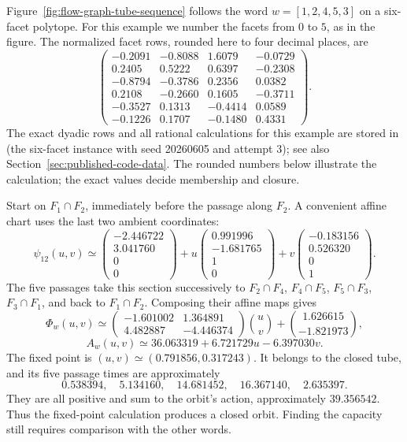 \begin{example}
\label{ex:flow-graph-return-map}
Figure~\ref{fig:flow-graph-tube-sequence} follows the word
\(w=[1,2,4,5,3]\) on a six-facet polytope.  For this example we number the
facets from \(0\) to \(5\), as in the figure.  The normalized facet rows,
rounded here to four decimal places, are
\[
\begin{pmatrix}
-0.2091&-0.8088& 1.6079&-0.0729\\
 0.2405& 0.5222& 0.6397&-0.2308\\
-0.8794&-0.3786& 0.2356& 0.0382\\
 0.2108&-0.2660& 0.1605&-0.3711\\
-0.3527& 0.1313&-0.4414& 0.0589\\
-0.1226& 0.1707&-0.1480& 0.4331
\end{pmatrix}.
\]
The exact dyadic rows and all rational calculations for this example are
stored in
(the six-facet instance with seed 20260605 and attempt 3); see also
Section~\ref{sec:published-code-data}.
The rounded numbers below illustrate the calculation; the exact values decide
membership and closure.

Start on \(F_1\cap F_2\), immediately before the passage along \(F_2\).
A convenient affine chart uses the last two ambient coordinates:
\[
\psi_{12}(u,v)\simeq
\begin{pmatrix}-2.446722\\3.041760\\0\\0\end{pmatrix}
+u\begin{pmatrix}0.991996\\-1.681765\\1\\0\end{pmatrix}
+v\begin{pmatrix}-0.183156\\0.526320\\0\\1\end{pmatrix}.
\]
The five passages take this section successively to
\(F_2\cap F_4\), \(F_4\cap F_5\), \(F_5\cap F_3\),
\(F_3\cap F_1\), and back to \(F_1\cap F_2\).
Composing their affine maps gives
\[
\Phi_w(u,v)\simeq
\begin{pmatrix}-1.601002&1.364891\\4.482887&-4.446374\end{pmatrix}
\binom uv+
\binom{1.626615}{-1.821973},
\]
\[
A_w(u,v)\simeq36.063319+6.721729u-6.397030v.
\]
The fixed point is \((u,v)\simeq(0.791856,0.317243)\).  It belongs to the
closed tube, and its five passage times are approximately
\[
  0.538394,\quad5.134160,\quad14.681452,\quad16.367140,\quad2.635397.
\]
They are all positive and sum to the orbit's action, approximately
\(39.356542\).  Thus the fixed-point calculation produces a closed orbit.
Finding the capacity still requires comparison with the other words.
\end{example}

